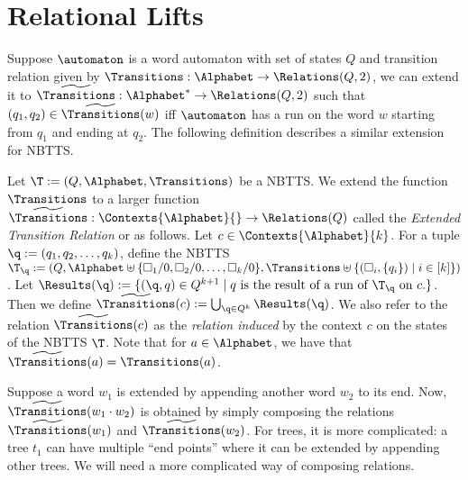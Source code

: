 
\section{Relational Lifts}\label{sec:relationalLifts}

Suppose $\automaton$ is a word automaton with set of states $Q$ and transition relation given by $\Transitions: \Alphabet \to \Relations(Q,2)$, we can extend it to $\widetilde{\Transitions}: \Alphabet^{*} \to \Relations(Q,2)$ such that $(q_1,q_{2}) \in \widetilde{\Transitions}(w)$ iff $\automaton$ has a run on the word $w$ starting from $q_{1}$ and ending at $q_{2}$. The following definition describes a similar extension for NBTTS.

\begin{definition}\label{def:extendedTransitionRelation}
  Let $\T := (Q, \Alphabet, \Transitions)$ be a NBTTS. We extend the function $\Transitions$ to a larger function $\widetilde{\Transitions} : \Contexts{\Alphabet}{} \to \Relations(Q)$ called the \emph{Extended Transition Relation} or \emph{\extendedTransitionRelation} as follows. Let $c \in \Contexts{\Alphabet}{k}$. For a tuple $\q := (q_1, q_2, \dots, q_k)$, define the NBTTS $\T_{\q} := (Q, \Alphabet\uplus\{\square_1/0, \square_2/0, \dots, \square_k/0\}, \Transitions\uplus\{(\square_i, \{q_i\}) \mid i \in [k] \})$. Let $\Results(\q) := \{(\q, q) \in Q^{k+1} \mid q \mbox{ is the result of a run of $\T_{\q}$ on $c$.}\}$. Then we define $\widetilde{\Transitions}(c) := \bigcup_{\q \in Q^k} \Results(\q)$. We also refer to the relation $\widetilde{\Transitions}(c)$ as the \emph{relation induced} by the context $c$ on the states of the NBTTS $\T$. Note that for $a \in \Alphabet$, we have that $\widetilde{\Transitions}(a) = \Transitions(a)$.
\end{definition}

Suppose a word $w_{1}$ is extended by appending another word $w_{2}$ to its end. Now, $\widetilde{\Transitions}(w_{1} \cdot w_{2})$ is obtained by simply composing the relations $\widetilde{\Transitions}(w_{1})$ and $\widetilde{\Transitions}(w_{2})$. For trees, it is more complicated: a tree $t_{1}$ can have multiple ``end points'' where it can be extended by appending other trees. We will need a more complicated way of composing relations.

